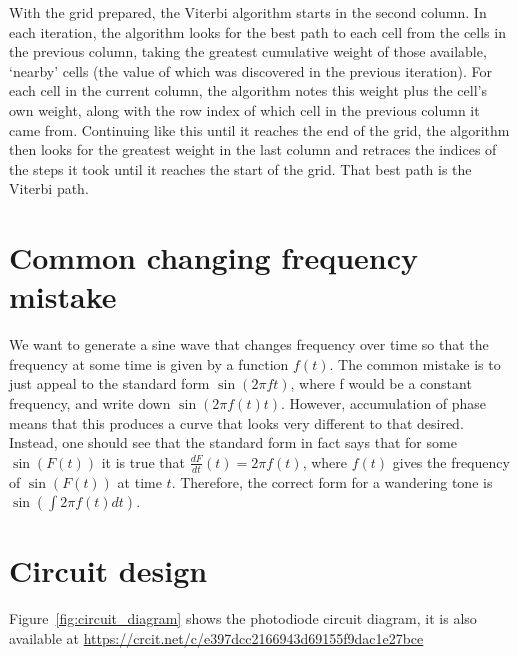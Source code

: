 \documentclass[prb,preprint]{revtex4-1}
\begin{document}
With the grid prepared, the Viterbi algorithm starts in the second column. In each iteration, the algorithm looks for the best path to each cell from the cells in the previous column, taking the greatest cumulative weight of those available, ‘nearby’ cells (the value of which was discovered in the previous iteration).
For each cell in the current column, the algorithm notes this weight plus the cell’s own weight, along with the row index of which cell in the previous column it came from.
Continuing like this until it reaches the end of the grid, the algorithm then looks for the greatest weight in the last column and retraces the indices of the steps it took until it reaches the start of the grid. That best path is the Viterbi path.


\section{Common changing frequency mistake}
\label{app:phase_gotcha}

We want to generate a sine wave that changes frequency over time so that the frequency at some time is given by a function $f(t)$. The common mistake is to just appeal to the standard form $\sin{(2 \pi f t)}$, where f would be a constant frequency, and write down $\sin{(2 \pi f(t) t)}$. However, accumulation of phase means that this produces a curve that looks very different to that desired. Instead, one should see that the standard form in fact says that for some $\sin{(F(t))}$ it is true that $\frac{dF}{dt}(t) = 2 \pi f(t)$, where $f(t)$ gives the frequency of $\sin{(F(t))}$ at time $t$. Therefore, the correct form for a wandering tone is $\sin{(\int{2 \pi f(t) dt})}$.

\section{Circuit design}
\label{app:circuit_diagram}

Figure~\ref{fig:circuit_diagram} shows the photodiode circuit diagram, it is also available at \url{https://crcit.net/c/e397dcc2166943d69155f9dac1e27bce}
\end{document}
